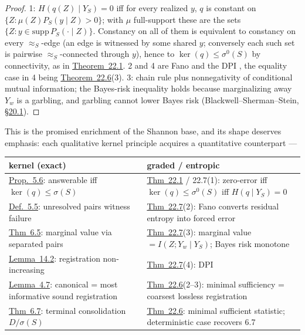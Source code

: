 \begin{proof}

1: \(H(q(Z) \mid Y_S) = 0\) iff for every realized \(y\), \(q\) is constant on \(\{Z : \mu(Z) P_S(y \mid Z) > 0\}\); with \(\mu\) full-support these are the sets \(\{Z : y \in \mathrm{supp}\, P_S(\cdot\mid Z)\}\). Constancy on all of them is equivalent to constancy on every \(\approx_S\)-edge (an edge is witnessed by some shared \(y\); conversely each such set is pairwise \(\approx_S\)-connected through \(y\)), hence to \(\ker(q) \le \sigma^0(S)\) by connectivity, as in \hyperlink{stmt:22.1}{Theorem~22.1}. 2 and 4 are Fano and the DPI \autocite{cover2006}, the equality case in 4 being \hyperlink{stmt:22.6}{Theorem~22.6}(3). 3: chain rule plus nonnegativity of conditional mutual information; the Bayes-risk inequality holds because marginalizing away \(Y_w\) is a garbling, and garbling cannot lower Bayes risk (Blackwell--Sherman--Stein, \hyperlink{sec:20.1}{§20.1}).
\end{proof}

This is the promised enrichment of the Shannon base, and its shape deserves emphasis: each qualitative kernel principle acquires a quantitative counterpart ---

{\def\LTcaptype{none} %
\begin{longtable}[]{@{}
  >{\raggedright\arraybackslash}p{}
  >{\raggedright\arraybackslash}p{}@{}}
\toprule\noalign{}
\begin{minipage}[b]{\linewidth}\raggedright
kernel (exact)
\end{minipage} & \begin{minipage}[b]{\linewidth}\raggedright
graded / entropic
\end{minipage} \\
\midrule\noalign{}
\endhead
\bottomrule\noalign{}
\endlastfoot
\hyperlink{stmt:5.6}{Prop.~5.6}: answerable iff \(\ker(q) \le \sigma(S)\) & \hyperlink{stmt:22.1}{Thm~22.1} / 22.7(1): zero-error iff \(\ker(q)\le\sigma^0(S)\) iff \(H(q \mid Y_S) = 0\) \\
\hyperlink{stmt:5.5}{Def.~5.5}: unresolved pairs witness failure & \hyperlink{stmt:22.7}{Thm~22.7}(2): Fano converts residual entropy into forced error \\
\hyperlink{stmt:6.5}{Thm~6.5}: marginal value via separated pairs & \hyperlink{stmt:22.7}{Thm~22.7}(3): marginal value \(= I(Z; Y_w \mid Y_S)\); Bayes risk monotone \\
\hyperlink{stmt:14.2}{Lemma~14.2}: registration non-increasing & \hyperlink{stmt:22.7}{Thm~22.7}(4): DPI \\
\hyperlink{stmt:4.7}{Lemma~4.7}: canonical = most informative sound registration & \hyperlink{stmt:22.6}{Thm~22.6}(2--3): minimal sufficiency = coarsest lossless registration \\
\hyperlink{stmt:6.7}{Thm~6.7}: terminal consolidation \(D/\sigma(S)\) & \hyperlink{stmt:22.6}{Thm~22.6}: minimal sufficient statistic; deterministic case recovers 6.7 \\
\end{longtable}
}

